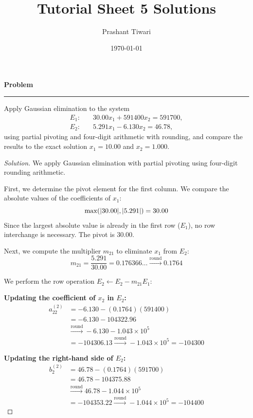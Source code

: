 \documentclass[11pt, a4paper]{article}
\title{\textbf{Tutorial Sheet 5 Solutions}}
\author{Prashant Tiwari}
\date{\today}
\DeclarePairedDelimiter\abs{\lvert}{\rvert}
\newenvironment{problem}{%
  \begin{tcolorbox}[
    colback=blue!4!white,
    colframe=blue!38!black,
    boxrule=0.95pt,
    arc=3pt,
    left=11pt,
    right=11pt,
    top=10pt,
    bottom=11pt,
    before skip=12pt,
    after skip=14pt,
  ]
  \noindent\textbf{\textcolor{blue!35!black}{Problem}}\par\nointerlineskip
  {\color{blue!42!black}\rule{\linewidth}{0.55pt}}\par\vspace{0.55em}%
}{%
  \end{tcolorbox}%
}
\newif\ifsolutionnewpage
\newenvironment{solution}
  {\begin{proof}[Solution]}
  {\end{proof}\ifsolutionnewpage\newpage\fi}
\begin{document}
\maketitle


\begin{problem}
    Apply Gaussian elimination to the system
    \begin{align*}
        E_{1}: \quad &30.00x_{1} + 591400x_{2} = 591700, \\
        E_{2}: \quad &5.291x_{1} - 6.130x_{2} = 46.78,
    \end{align*}
    using partial pivoting and four-digit arithmetic with rounding, and compare the results to the exact solution $x_{1}=10.00$ and $x_{2}=1.000$.
\end{problem}

\begin{solution}
    We apply Gaussian elimination with partial pivoting using four-digit rounding arithmetic. 
    
    First, we determine the pivot element for the first column. We compare the absolute values of the coefficients of $x_1$:
    \[
    \max(\abs{30.00}, \abs{5.291}) = 30.00
    \]
    Since the largest absolute value is already in the first row ($E_1$), no row interchange is necessary. The pivot is $30.00$.

    Next, we compute the multiplier $m_{21}$ to eliminate $x_1$ from $E_2$:
    \[
    m_{21} = \frac{5.291}{30.00} = 0.176366\dots \xrightarrow{\text{round}} 0.1764
    \]

    We perform the row operation $E_2 \leftarrow E_2 - m_{21}E_1$:
    
    \textbf{Updating the coefficient of $x_2$ in $E_2$:}
    \begin{align*}
        a_{22}^{(2)} &= -6.130 - (0.1764)(591400) \\
        &= -6.130 - 104322.96 \\
        &\xrightarrow{\text{round}} -6.130 - 1.043 \times 10^5 \\
        &= -104306.13 \xrightarrow{\text{round}} -1.043 \times 10^5 = -104300
    \end{align*}

    \textbf{Updating the right-hand side of $E_2$:}
    \begin{align*}
        b_{2}^{(2)} &= 46.78 - (0.1764)(591700) \\
        &= 46.78 - 104375.88 \\
        &\xrightarrow{\text{round}} 46.78 - 1.044 \times 10^5 \\
        &= -104353.22 \xrightarrow{\text{round}} -1.044 \times 10^5 = -104400
    \end{align*}


\end{solution}
\end{document}
